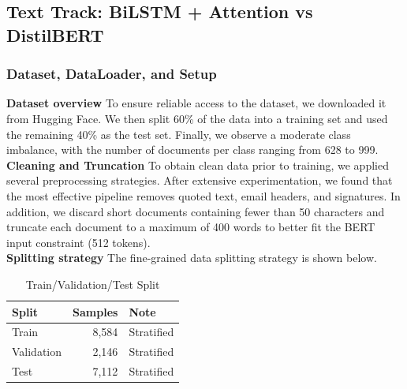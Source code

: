 \documentclass[twoside,final]{hcmut-report}
\begin{document}


\subsection{Text Track: BiLSTM + Attention vs DistilBERT}
\subsubsection{Dataset, DataLoader, and Setup}
\noindent \textbf{Dataset overview} To ensure reliable access to the dataset, we downloaded it from Hugging Face. We then split 60\% of the data into a training set and used the remaining 40\% as the test set. Finally, we observe a moderate class imbalance, with the number of documents per class ranging from 628 to 999. \\ 

\noindent \textbf{Cleaning and Truncation} To obtain clean data prior to training, we applied several preprocessing strategies. After extensive experimentation, we found that the most effective pipeline removes quoted text, email headers, and signatures. In addition, we discard short documents containing fewer than 50 characters and truncate each document to a maximum of 400 words to better fit the BERT input constraint (512 tokens). \\ 

\noindent \textbf{Splitting strategy} The fine-grained data splitting strategy is shown below.

\begin{table}[H]
\centering
\caption{Train/Validation/Test Split}
\begin{tabular}{lrl}
\toprule
\textbf{Split} & \textbf{Samples} & \textbf{Note} \\
\midrule
Train & 8,584 & Stratified \\
Validation & 2,146 & Stratified \\
Test & 7,112 & Stratified \\
\bottomrule
\end{tabular}
\end{table}
\end{document}
